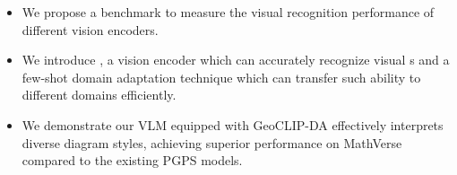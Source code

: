 \begin{itemize}
    \item We propose a benchmark to measure the visual \geofeat{} recognition performance of different vision encoders.
    \item We introduce \geoclip{}, a vision encoder which can accurately recognize visual \geofeat{}s and a few-shot domain adaptation technique which can transfer such ability to different domains efficiently. 
    \item We demonstrate our VLM equipped with GeoCLIP-DA effectively interprets diverse diagram styles, achieving superior performance on MathVerse compared to the existing PGPS models.
\end{itemize}

\fi 
